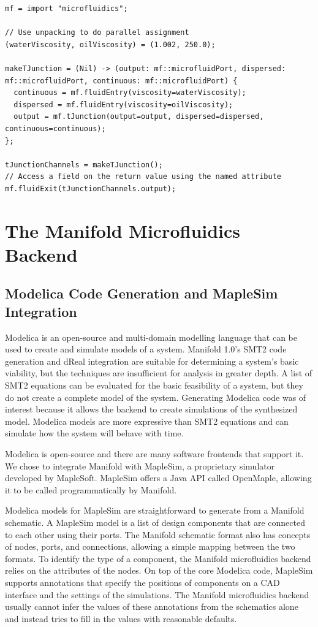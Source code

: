 \begin{lstlisting}[label=lst:unpacking, caption=Examples of new tuple features]
mf = import "microfluidics";

// Use unpacking to do parallel assignment
(waterViscosity, oilViscosity) = (1.002, 250.0);

makeTJunction = (Nil) -> (output: mf::microfluidPort, dispersed: mf::microfluidPort, continuous: mf::microfluidPort) {
  continuous = mf.fluidEntry(viscosity=waterViscosity);
  dispersed = mf.fluidEntry(viscosity=oilViscosity);
  output = mf.tJunction(output=output, dispersed=dispersed, continuous=continuous);
};

tJunctionChannels = makeTJunction();
// Access a field on the return value using the named attribute
mf.fluidExit(tJunctionChannels.output);
\end{lstlisting}

\section{The Manifold Microfluidics Backend}

\subsection{Modelica Code Generation and MapleSim Integration}

Modelica is an open-source and multi-domain modelling language that can be used
to create and simulate models of a system. \cite{Maplesim}\cite{modelica}
Manifold 1.0's SMT2 code generation and dReal integration are suitable for
determining a system's basic viability, but the techniques are insufficient for
analysis in greater depth.
A list of SMT2 equations can be evaluated for the basic feasibility of a system, but they do not create
a complete model of the system.
Generating Modelica code was of interest because it allows the backend to create simulations of the
synthesized model.
Modelica models are more expressive than SMT2 equations and can simulate how the system will behave with time.

Modelica is open-source and there are many software frontends that support it.
We chose to integrate Manifold with MapleSim, a proprietary simulator developed by MapleSoft.
MapleSim offers a Java API called OpenMaple, allowing it to be called programmatically by Manifold.

Modelica models for MapleSim are straightforward to generate from a Manifold schematic.
A MapleSim model is a list of design components that are connected to each other using their ports.
The Manifold schematic format also has concepts of nodes, ports, and connections, allowing a simple mapping
between the two formats.
To identify the type of a component, the Manifold microfluidics backend relies on the attributes of the nodes.
On top of the core Modelica code, MapleSim supports annotations that specify the positions of components on a CAD interface and the settings of the simulations.
The Manifold microfluidics backend usually cannot infer the values of these annotations from the schematics
alone and instead tries to fill in the values with reasonable defaults.

